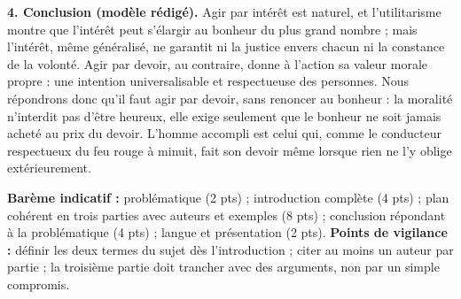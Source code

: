\documentclass[11pt]{article}
\begin{document}
\begin{corrige}
\textbf{4. Conclusion (modèle rédigé).} Agir par intérêt est naturel, et l'utilitarisme montre que l'intérêt peut s'élargir au bonheur du plus grand nombre ; mais l'intérêt, même généralisé, ne garantit ni la justice envers chacun ni la constance de la volonté. Agir par devoir, au contraire, donne à l'action sa valeur morale propre : une intention universalisable et respectueuse des personnes. Nous répondrons donc qu'il faut agir par devoir, sans renoncer au bonheur : la moralité n'interdit pas d'être heureux, elle exige seulement que le bonheur ne soit jamais acheté au prix du devoir. L'homme accompli est celui qui, comme le conducteur respectueux du feu rouge à minuit, fait son devoir même lorsque rien ne l'y oblige extérieurement.

\textbf{Barème indicatif :} problématique (2 pts) ; introduction complète (4 pts) ; plan cohérent en trois parties avec auteurs et exemples (8 pts) ; conclusion répondant à la problématique (4 pts) ; langue et présentation (2 pts).
\textbf{Points de vigilance :} définir les deux termes du sujet dès l'introduction ; citer au moins un auteur par partie ; la troisième partie doit trancher avec des arguments, non par un simple compromis.
\end{corrige}
\end{document}
